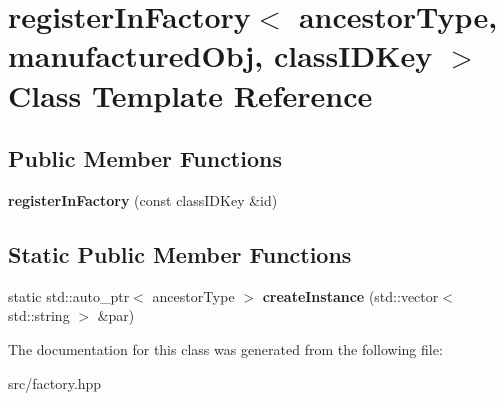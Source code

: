 \hypertarget{classregisterInFactory}{}\section{register\+In\+Factory$<$ ancestor\+Type, manufactured\+Obj, class\+I\+D\+Key $>$ Class Template Reference}
\label{classregisterInFactory}
\subsection*{Public Member Functions}
\begin{DoxyCompactItemize}
\item 
{\bfseries register\+In\+Factory} (const class\+I\+D\+Key \&id)\hypertarget{classregisterInFactory_ab886f40a36de75f72679ef424467c57b}{}\label{classregisterInFactory_ab886f40a36de75f72679ef424467c57b}

\end{DoxyCompactItemize}
\subsection*{Static Public Member Functions}
\begin{DoxyCompactItemize}
\item 
static std\+::auto\+\_\+ptr$<$ ancestor\+Type $>$ {\bfseries create\+Instance} (std\+::vector$<$ std\+::string $>$ \&par)\hypertarget{classregisterInFactory_a9aac38120641fe19e2d896a924e02d94}{}\label{classregisterInFactory_a9aac38120641fe19e2d896a924e02d94}

\end{DoxyCompactItemize}


The documentation for this class was generated from the following file\+:\begin{DoxyCompactItemize}
\item 
src/factory.\+hpp\end{DoxyCompactItemize}
